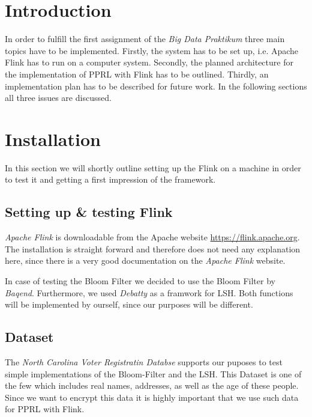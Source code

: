 \documentclass[10pt]{article}
\begin{document}
    

    \section{Introduction}

        In order to fulfill the first assignment of the \textit{Big Data Praktikum} three main topics have to be
        implemented. Firstly, the system has to be set up, i.e. Apache Flink has to run on a computer system. Secondly,
        the planned architecture for the implementation of PPRL with Flink has to be outlined. Thirdly, an
        implementation plan has to be described for future work.
        In the following sections all three issues are discussed.

    \section{Installation}

        In this section we will shortly outline setting up the Flink on a machine in order to test it and
        getting a first impression of the framework.

        \subsection{Setting up \& testing Flink}

        \textit{Apache Flink}\cite{ApacheFlink} is downloadable from the Apache website \url{https://flink.apache.org}. The installation
            is straight forward and therefore does not need any explanation here, since there is a very good
            documentation on the \textit{Apache Flink} website.

            In case of testing the Bloom Filter we decided to use the Bloom Filter by \textit{Baqend}\cite{Baqend}. Furthermore,
            we used \textit{Debatty}\cite{Debatty} as a framwork for LSH. Both functions will be implemented by ourself, since
            our purposes will be different.

        \subsection{Dataset}


        The \textit{North Carolina Voter Registratin Databse}\cite{NorthCarolinaVoterRegistration}
            supports our puposes to test
            simple implementations of the Bloom-Filter and the LSH. This Dataset is one of the few
            which includes real names, addresses, as well as the age of these people. Since we want to encrypt this data
            it is highly important that we use such data for PPRL with Flink.
\end{document}
